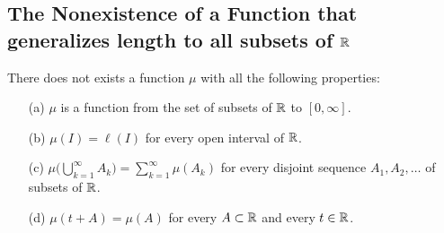 \documentclass[11pt,a4paper]{book}
\begin{document}
\subsection{The Nonexistence of a Function that generalizes length to all subsets of \( \mathbb{R}  \)}

\begin{prop}
   There does not exists a function \( \mu  \) with all the following properties: 
   \begin{enumerate}
       \item[(a)] \( \mu  \) is a function from the set of subsets of \( \mathbb{R}  \) to \( [0,\infty ] \).
        \item[(b)] \( \mu(I) = \ell(I) \) for every open interval of \( \mathbb{R}  \).
        \item[(c)] \( \mu \Big(  \bigcup_{ k = 1  }^{ \infty  }  {A}_{k } \Big) = \sum_{ k=1  }^{ \infty  } \mu( {A}_{k })  \) for every disjoint sequence \( {A}_{1}, {A}_{2}, \dots  \) of subsets of \( \mathbb{R}  \).
        \item[(d)] \( \mu(t + A ) = \mu(A) \) for every \( A \subset \mathbb{R}  \) and every \( t \in \mathbb{R}  \).
   \end{enumerate}
\end{prop}
\end{document}
